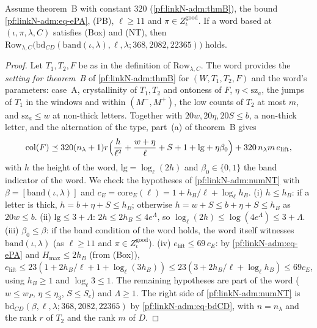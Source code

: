\begin{proposition}\label{pf:linkN-adm:rowNT}
Assume theorem~B with constant $320$ (\cref{pf:linkN-adm:thmB}), the bound \eqref{pf:linkN-adm:eq-ePA},
(PB), $\ell\ge11$ and $\pi\in Z^{\mathrm{good}}_\iota$. If a word based at
$(\iota,\pi,\lambda,C)$ satisfies (Box) and (NT), then
$\mathrm{Row}_{\lambda,C}\bigl(\mathrm{bd}_{CD}(\mathrm{band}(\iota,\lambda),\ell,\lambda;368,2082,22365)\bigr)$ holds.
\end{proposition}

\begin{proof}
Let $T_1,T_2,F$ be as in the definition of $\mathrm{Row}_{\lambda,C}$. The word provides the \emph{setting for theorem~B} of \cref{pf:linkN-adm:thmB} for
$(W,T_1,T_2,F)$ and the word's parameters: case~A, crystallinity of $T_1,T_2$ and ontoness of $F$, $\eta<\mathrm{sz}_a$,
the jumps of $T_1$ in the windows and within $(M^-,M^+)$, the low counts of $T_2$ at most $m$, and $\mathrm{sz}_a\le w$ at
non-thick letters. Together with $20w,20\eta,20S\le b$, a non-thick letter, and the alternation of the type, part~(a)
of theorem~B gives
\[
\operatorname{col}(F)\preceq320(n_\lambda+1)r\Bigl(\frac{h}{\ell^2}+\frac{w+\eta}{\ell}+S+1+\mathrm{lg}+\eta\beta_0\Bigr)
+320\,n_\lambda m\,e_{\mathrm{lift}},
\]
with $h$ the height of the word, $\mathrm{lg}=\log_\ell(2h)$ and $\beta_0\in\{0,1\}$ the band indicator of the word.
We check the hypotheses of \cref{pf:linkN-adm:numNT} with $\beta=[\mathrm{band}(\iota,\lambda)]$ and
$c_E=\mathrm{core}_E(\ell)=1+h_B/\ell+\log_\ell h_B$.
(i) $h\le h_B$: if a letter is thick, $h=b+\eta+S\le h_B$; otherwise $h=w+S\le b+\eta+S\le h_B$ as $20w\le b$.
(ii) $\mathrm{lg}\le3+\Lambda$: $2h\le2h_B\le4e^\Lambda$, so $\log_\ell(2h)\le\log(4e^\Lambda)\le3+\Lambda$.
(iii) $\beta_0\le\beta$: if the band condition of the word holds, the word itself witnesses $\mathrm{band}(\iota,\lambda)$
(as $\ell\ge11$ and $\pi\in Z^{\mathrm{good}}_\iota$).
(iv) $e_{\mathrm{lift}}\le69\,c_E$: by \eqref{pf:linkN-adm:eq-ePA} and $H_{\max}\le2h_B$ (from (Box)),
$e_{\mathrm{lift}}\le23(1+2h_B/\ell+1+\log_\ell(3h_B))\le23(3+2h_B/\ell+\log_\ell h_B)\le69c_E$, using $h_B\ge1$ and
$\log_\ell3\le1$.
The remaining hypotheses are part of the word ($w\le w_P$, $\eta\le\eta_3$, $S\le S_c$) and $\Lambda\ge1$. The right side
of \cref{pf:linkN-adm:numNT} is $\mathrm{bd}_{CD}(\beta,\ell,\lambda;368,2082,22365)$ by \eqref{pf:linkN-adm:eq-bdCD}, with
$n=n_\lambda$ and the rank $r$ of $T_2$ and the rank $m$ of $D$.
\end{proof}

